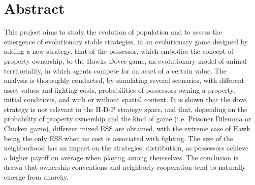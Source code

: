 \chapter*{Abstract} 
    This project aims to study the evolution of population and to assess the emergence of 
    evolutionary stable strategies, in an evolutionary game designed by adding a new strategy, 
    that of the possessor, which embodies the concept of property ownership, to the Hawks-Doves game, 
    an evolutionary model of animal territoriality, in which agents compete for an asset of a certain 
    value.
    The analysis is thoroughly conducted, by simulating several scenarios, with different asset values and 
    fighting costs, probabilities of possessors owning a property, initial conditions, and with or without spatial context.
    It is shown that the dove strategy is not relevant in the H-D-P strategy space, and that, 
    depending on the probability of property ownership and the kind of game (i.e. Prisoner Dilemma or Chicken game),
    different mixed ESS are obtained, with the extreme case of Hawk being the only ESS when no cost is 
    associated with fighting. The size of the neighborhood has an impact on the strategies' distribution, 
    as possessors achieve a higher payoff on average when playing among themselves.
    The conclusion is drawn that ownership conventions and neighborly cooperation tend to 
    naturally emerge from anarchy.